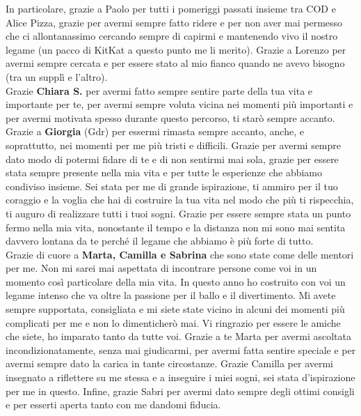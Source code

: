 \noindent In particolare, grazie a Paolo per tutti i pomeriggi passati insieme tra COD e Alice Pizza, grazie per avermi sempre fatto ridere e per non aver mai permesso che ci allontanassimo cercando sempre di capirmi e mantenendo vivo il nostro legame (un pacco di KitKat a questo punto me li merito). Grazie a Lorenzo per avermi sempre cercata e per essere stato al mio fianco quando ne avevo bisogno (tra un supplì e l'altro).\\


\noindent Grazie \textbf{Chiara S.} per avermi fatto sempre sentire parte della tua vita e importante per te, per avermi sempre voluta vicina nei momenti più importanti e per avermi motivata spesso durante questo percorso, ti starò sempre accanto.\\

\noindent Grazie a \textbf{Giorgia} (Gdr) per essermi rimasta sempre accanto, anche, e soprattutto, nei momenti per me più tristi e difficili. Grazie per avermi sempre dato modo di potermi fidare di te e di non sentirmi mai sola,  grazie per essere stata sempre presente nella mia vita e per tutte le esperienze che abbiamo condiviso insieme. Sei stata per me di grande ispirazione, ti ammiro per il tuo coraggio e la voglia che hai di costruire la tua vita nel modo che più ti rispecchia, ti auguro di realizzare tutti i tuoi sogni. Grazie per essere sempre stata un punto fermo nella mia vita, nonostante il tempo e la distanza non mi sono mai sentita davvero lontana da te perché il legame che abbiamo è più forte di tutto.\\

\noindent Grazie di cuore a \textbf{Marta, Camilla e Sabrina} che sono state come delle mentori per me. Non mi sarei mai aspettata di incontrare persone come voi in un momento così particolare della mia vita. In questo anno ho costruito con voi un legame intenso che va oltre la passione per il ballo e il divertimento. Mi avete sempre supportata, consigliata e mi siete state vicino in alcuni dei momenti più complicati per me e non lo dimenticherò mai. Vi ringrazio per essere le amiche che siete, ho imparato tanto da tutte voi. Grazie a te Marta per avermi ascoltata incondizionatamente, senza mai giudicarmi, per avermi fatta sentire speciale e per avermi sempre dato la carica in tante circostanze. Grazie Camilla per avermi insegnato a riflettere su me stessa e a inseguire i miei sogni, sei stata d'ispirazione per me in questo. Infine, grazie Sabri per avermi dato sempre degli ottimi consigli e per esserti aperta tanto con me dandomi fiducia.\\


